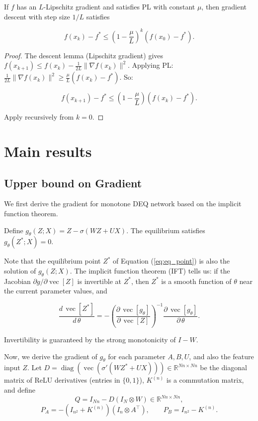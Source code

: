 \documentclass[twoside]{article}
\begin{document}
\begin{theorem}
If $f$ has an $L$-Lipschitz gradient and satisfies PL with constant
$\mu$, then gradient descent with step size $1/L$ satisfies

$$f(x_k) - f^* \leq \left(1 - \frac{\mu}{L}\right)^k (f(x_0) - f^*).$$
\end{theorem}

\begin{proof}
The descent lemma (Lipschitz gradient) gives
$f(x_{k+1}) \leq f(x_k) - \frac{1}{2L}\|\nabla f(x_k)\|^2.$
Applying PL: $\frac{1}{2L}\|\nabla f(x_k)\|^2 \geq \frac{\mu}{L}(f(x_k) - f^*)$. So:

$$f(x_{k+1}) - f^* \leq \left(1 - \frac{\mu}{L}\right)(f(x_k) - f^*).$$

Apply recursively from $k = 0$. 
\end{proof}

\section{Main results}

\subsection{Upper bound on Gradient}
We first derive the gradient for monotone DEQ network based on the implicit function theorem.

\begin{definition}
Define $g_\theta(Z; X) = Z - \sigma(WZ + UX)$. The equilibrium satisfies $g_\theta(Z^*; X) = 0$.
\end{definition}

Note that the equilibrium point $Z^*$ of Equation (\ref{eq:eq_point}) is also the solution of $g_{\theta}(Z; X)$.
The implicit function theorem (IFT) tells us: if the Jacobian $\partial g / \partial \operatorname{vec}[Z]$
is invertible at $Z^*$, then $Z^*$ is a smooth function of $\theta$ near the current parameter
values, and

$$\frac{d\,\operatorname{vec}[Z^*]}{d\,\theta}
= -\left(\frac{\partial\,\operatorname{vec}[g_\theta]}{\partial\,\operatorname{vec}[Z]}\right)^{-1}
\frac{\partial\,\operatorname{vec}[g_\theta]}{\partial\,\theta}.
\label{eq:IFT}
$$

Invertibility is guaranteed by the strong monotonicity of $I - W$. 

Now, we derive the gradient of $g_\theta$ for each parameter $A, B, U$, and also the feature input $Z$.
Let $D = \operatorname{diag}(\operatorname{vec}(\sigma'(WZ^* + UX))) \in \mathbb{R}^{Nn \times Nn}$ be the diagonal matrix of ReLU derivatives (entries in $\{0, 1\}$), 
$K^{(n)}$ is a commutation matrix, and define
$$Q = I_{Nn} - D(I_N \otimes W) \in \mathbb{R}^{Nn \times Nn},$$
$$P_A = -(I_{n^2} + K^{(n)})(I_n \otimes A^\top), \qquad
P_B = I_{n^2} - K^{(n)}.$$
\end{document}

